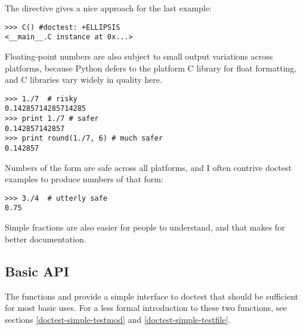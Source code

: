 The  directive gives a nice approach for the last
example:

\begin{verbatim}
>>> C() #doctest: +ELLIPSIS
<__main__.C instance at 0x...>
\end{verbatim}

Floating-point numbers are also subject to small output variations across
platforms, because Python defers to the platform C library for float
formatting, and C libraries vary widely in quality here.

\begin{verbatim}
>>> 1./7  # risky
0.14285714285714285
>>> print 1./7 # safer
0.142857142857
>>> print round(1./7, 6) # much safer
0.142857
\end{verbatim}

Numbers of the form  are safe across all platforms, and I
often contrive doctest examples to produce numbers of that form:

\begin{verbatim}
>>> 3./4  # utterly safe
0.75
\end{verbatim}

Simple fractions are also easier for people to understand, and that makes
for better documentation.

\subsection{Basic API\label{doctest-basic-api}}

The functions  and  provide a
simple interface to doctest that should be sufficient for most basic
uses.  For a less formal introduction to these two functions, see
sections \ref{doctest-simple-testmod} and
\ref{doctest-simple-testfile}.

